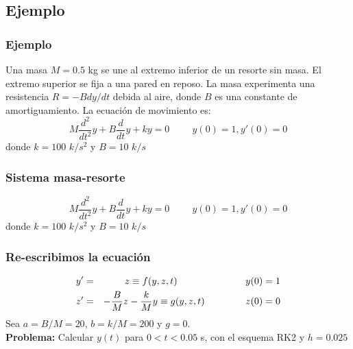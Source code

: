 \subsection{Ejemplo}
\begin{frame}
\frametitle{Ejemplo}
Una masa $M = 0.5$ kg se une al extremo inferior de un resorte sin masa. El extremo superior se fija a una pared en reposo. La masa experimenta una resistencia $R = -B dy/dt$ debida al aire, donde $B$ es una constante de amortiguamiento. La ecuaci\'{o}n de movimiento es:
\[ M \dfrac{d^{2}}{dt^{2}}y + B \dfrac{d}{dt}y + ky = 0 \hspace{1cm}y(0)=1,y'(0)=0 \]
donde $k=100$ $k/s^{2}$ y $B=10$ $k/s$
\end{frame}
\begin{frame}
\frametitle{Sistema masa-resorte}
\begin{center}
\end{center}
\[ M \dfrac{d^{2}}{dt^{2}}y + B \dfrac{d}{dt}y + ky = 0 \hspace{1cm}y(0)=1,y'(0)=0 \]
donde $k=100$ $k/s^{2}$ y $B=10$ $k/s$
\end{frame}
\begin{frame}
\frametitle{Re-escribimos la ecuaci\'{o}n}
\begin{eqnarray*}
	y' & = & z \equiv f(y,z,t) \hspace{2.5cm} y(0)=1 \\
	z' & = & - \dfrac{B}{M} z - \dfrac{k}{M} y \equiv g(y,z,t) \hspace{1.5cm} z(0)=0
\end{eqnarray*}
Sea $a=B/M=20$, $b=k/M=200$ y $g=0$.
\\
\bigskip
\textbf{Problema: } Calcular $y(t)$ para $0 < t < 0.05$ s, con el esquema RK2  y $h=0.025$ 
\end{frame}
